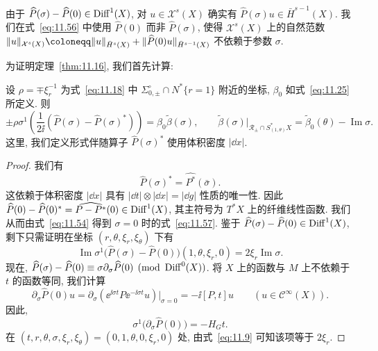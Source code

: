 由于 $\widehat{P}(\sigma) - \widehat{P}(0) \in \operatorname{Diff}^1(X)$, 对 $u \in \mathcal{X}^s(X)$ 确实有 $\widehat{P}(\sigma) u \in \bar H^{s-1}(X)$. 我们在式~\eqref{eq:11.56} 中使用 $\widehat{P}(0)$ 而非 $\widehat{P}(\sigma)$, 使得 $\mathcal{X}^s(X)$ 上的自然范数 $\|u\|_{\mathcal{X}^s(X)} \defeq \|u\|_{\bar H^s(X)} + \|\widehat{P}(0) u\|_{\bar H^{s-1}(X)}$ 不依赖于参数 $\sigma$.

为证明定理~\ref{thm:11.16}, 我们首先计算:

\begin{lemma}\label{lem:11.17}
设 $\rho = \mp \xi_r^{-1}$ 为式~\eqref{eq:11.18} 中 $\Sigma_{0, \pm}^\circ \cap N^*\{r = 1\}$ 附近的坐标, $\beta_0$ 如式~\eqref{eq:11.25} 所定义. 则
\begin{equation}\label{eq:11.57}
    \pm \rho \sigma^1\left( \frac{1}{2\ii}(\widehat{P}(\sigma) - \widehat{P}(\sigma)^*) \right) = \beta_0 \tilde\beta(\sigma), \qquad \tilde\beta(\sigma)|_{\mathcal{R}_\pm \cap S_{(1,\theta)}^* X} = \tilde\beta_0(\theta) - \operatorname{Im}\sigma.
\end{equation}
这里, 我们定义形式伴随算子 $\widehat{P}(\sigma)^*$ 使用体积密度 $|\dd x|$.
\end{lemma}

\begin{proof}
我们有
\begin{equation}\label{eq:11.58}
    \widehat{P}(\sigma)^* = \widehat{P^*}(\bar\sigma).
\end{equation}
这依赖于体积密度 $|\dd x|$ 具有 $|\dd t| \otimes |\dd x| = |\dd g|$ 性质的唯一性. 因此 $\widehat{P}(0) - \widehat{P}(0)^* = \widehat{P - P^*}(0) \in \operatorname{Diff}^1(X)$, 其主符号为 $T^* X$ 上的纤维线性函数. 我们从而由式~\eqref{eq:11.54} 得到 $\sigma = 0$ 时的式~\eqref{eq:11.57}. 鉴于 $\widehat{P}(\sigma) - \widehat{P}(0) \in \operatorname{Diff}^1(X)$, 剩下只需证明在坐标 $(r, \theta, \xi_r, \xi_\theta)$ 下有
\begin{equation}\label{eq:11.59}
    \operatorname{Im}\sigma^1\big( \widehat{P}(\sigma) - \widehat{P}(0) \big)(1, \theta, \xi_r, 0) = 2\xi_r \operatorname{Im}\sigma.
\end{equation}
现在, $\widehat{P}(\sigma) - \widehat{P}(0) \equiv \sigma \partial_\sigma \widehat{P}(0) \pmod{\operatorname{Diff}^0(X)}$. 将 $X$ 上的函数与 $M$ 上不依赖于 $t$ 的函数等同, 我们计算
\begin{equation}\label{eq:11.60}
    \partial_\sigma \widehat{P}(0) u = \partial_\sigma\left( \ee^{\ii \sigma t} P \ee^{-\ii \sigma t} u \right)\Big|_{\sigma=0} = -\ii [P, t] u \qquad (u \in \mathcal{C}^\infty(X)).
\end{equation}
因此,
\begin{equation}\label{eq:11.61}
    \sigma^1\big(\partial_\sigma \widehat{P}(0)\big) = -H_G t.
\end{equation}
在 $(t, r, \theta, \sigma, \xi_r, \xi_\theta) = (0, 1, \theta, 0, \xi_r, 0)$ 处, 由式~\eqref{eq:11.9} 可知该项等于 $2\xi_r$.
\end{proof}

